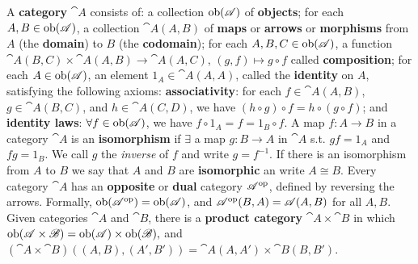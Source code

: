  A \textbf{category} $\cat{A}$ consists of: a collection $\mathrm{ob}(\mathscr{A})$ of \textbf{objects}; for each $A, B \in \mathrm{ob}(\mathscr{A})$, a collection $\cat{A}(A,B)$ of \textbf{maps} or \textbf{arrows} or \textbf{morphisms} from $A$ (the \textbf{domain}) to $B$ (the \textbf{codomain}); for each $A, B, C \in \mathrm{ob}(\mathscr{A})$, a function $\cat{A}(B,C) \times \cat{A}(A,B) \to \cat{A}(A,C)$, $(g,f) \mapsto g \circ f$ called \textbf{composition}; for each $A \in \mathrm{ob}(\mathscr{A})$, an element $1_A \in \cat{A}(A, A)$, called the \textbf{identity} on $A$, satisfying the following axioms: \textbf{associativity}: for each $f \in \cat{A}(A,B)$, $g \in \cat{A}(B,C)$, and $h \in \cat{A}(C,D)$, we have $(h \circ g) \circ f = h \circ (g \circ f)$; and \textbf{identity laws}: $\forall f \in \mathrm{ob}(\mathscr{\mathscr{A}})$, we have $f \circ 1_A = f = 1_B \circ f$.
 A map $f: A \to B$ in a category $\cat{A}$ is an \textbf{isomorphism} if $\exists$ a map $g: B \to A$ in $\cat{A}$ s.t. $gf = 1_A$ and $fg = 1_B$. We call $g$ the \textit{inverse} of $f$ and write $g = f^{-1}$. If there is an isomorphism from $A$ to $B$ we say that $A$ and $B$ are \textbf{isomorphic} an write $A \cong B$.
 Every category $\cat{A}$ has an \textbf{opposite} or \textbf{dual} category $\mathscr{A}^{\operatorname{op}}$, defined by reversing the arrows. Formally, $\mathrm{ob}(\mathscr{A^{\operatorname{op}}}) = \mathrm{ob}(\mathscr{A})$, and $\mathscr{A}^{\operatorname{op}}(B,A) = \mathscr{A}(A,B)$ for all $A,B$.
 Given categories $\cat{A}$ and $\cat{B}$, there is a \textbf{product category} $\cat{A} \times \cat{B}$ in which $\mathrm{ob}(\mathscr{A \times B}) = \mathrm{ob}(\mathscr{A}) \times \mathrm{ob}(\mathscr{B}),$ and $(\cat{A} \times \cat{B})((A,B),(A',B')) = \cat{A}(A,A') \times \cat{B}(B,B')$.
